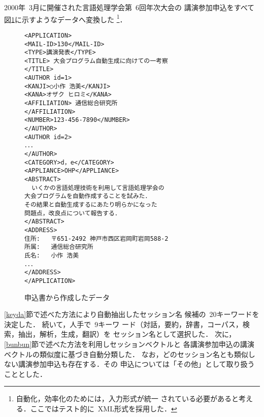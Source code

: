 2000年\ 3月に開催された言語処理学会第\ 6回年次大会の
講演参加申込をすべて図\ref{datada}に示すようなデータへ変換した
\footnote{自動化，効率化のためには，入力形式が統一
されている必要があると考える．ここではテスト的に\ XML形式を採用した．}．
\begin{figure}
{\footnotesize {\bf
\begin{verbatim}
<APPLICATION>
<MAIL-ID>130</MAIL-ID>
<TYPE>講演発表</TYPE>
<TITLE> 大会プログラム自動生成に向けての一考察 
</TITLE>
<AUTHOR id=1>
<KANJI>○小作 浩美</KANJI>
<KANA>オザク ヒロミ</KANA>
<AFFILIATION> 通信総合研究所
</AFFILIATION>
<NUMBER>123-456-7890</NUMBER>
</AUTHOR>
<AUTHOR id=2>
．．．
</AUTHOR>
<CATEGORY>d，e</CATEGORY>
<APPLIANCE>OHP</APPLIANCE>
<ABSTRACT>
  いくかの言語処理技術を利用して言語処理学会の
大会プログラムを自動作成することを試みた．
その結果と自動生成するにあたり明らかになった
問題点，改良点について報告する．
</ABSTRACT>
<ADDRESS>
住所:   〒651-2492 神戸市西区岩岡町岩岡588-2
所属:   通信総合研究所
氏名:   小作 浩美
．．．
</ADDRESS>
</APPLICATION>
\end{verbatim}
}}
\vspace*{-5mm}
\caption[図]{\label{datada}申込書から作成したデータ}
\vspace*{-5mm}
\end{figure}
\ref{keyda}節で述べた方法により自動抽出したセッション名
候補の\ 20キーワードを決定した．
続いて，人手で\ 9キーワ
ード（対話，要約，辞書，コーパス，検索，抽出，解析，生成，翻訳）を
セッション名として選択した．
次に，\ref{bunbun}節で述べた方法を利用しセッションベクトルと
各講演参加申込の講演ベクトルの類似度に基づき自動分類した．
なお，どのセッション名とも類似しない講演参加申込も存在する．その
申込については「その他」として取り扱うこととした．

